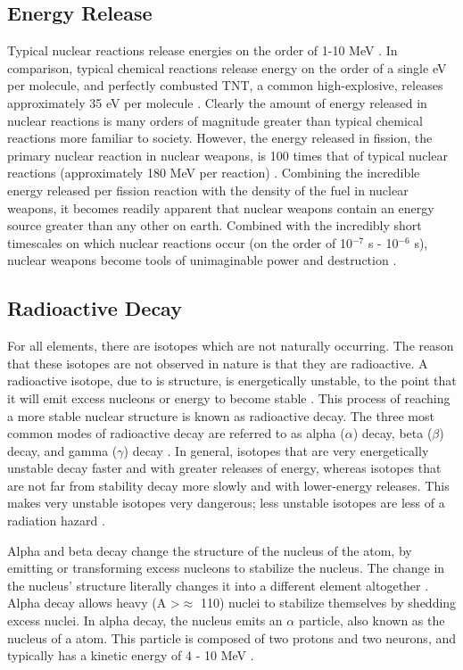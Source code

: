 \documentclass{report}
\begin{document}
\subsection{Energy Release}

Typical nuclear reactions release energies on the order of 1-10 MeV \cite{Prussin2014}. In comparison, typical chemical reactions release energy on the order of a single eV per molecule, and perfectly combusted TNT, a common high-explosive, releases approximately 35 eV per molecule \cite{Prussin2014}. Clearly the amount of energy released in nuclear reactions is many orders of magnitude greater than typical chemical reactions more familiar to society. However, the energy released in fission, the primary nuclear reaction in nuclear weapons, is 100 times that of typical nuclear reactions (approximately 180 MeV per reaction) \cite{krane1987introductory,Loveland2005}. Combining the incredible energy released per fission reaction with the density of the fuel in nuclear weapons, it becomes readily apparent that nuclear weapons contain an energy source greater than any other on earth. Combined  with the incredibly short timescales on which nuclear reactions occur (on the order of 10\(^{-7}\) s - 10\(^{-6}\) s),  nuclear weapons become tools of unimaginable power and destruction \cite{Loveland2005,Cochran1994}.  


\subsection{Radioactive Decay}

For all elements, there are isotopes which are not naturally occurring. The reason that these isotopes are not observed in nature is that they are radioactive. A radioactive isotope, due to is structure, is energetically unstable, to the point that it will emit excess nucleons or energy to become stable \cite{Loveland2005}. This process of reaching a more stable nuclear structure is known as radioactive decay. The three most common modes of radioactive decay are referred to as alpha (\(\alpha\)) decay, beta (\(\beta\)) decay, and gamma (\(\gamma\)) decay \cite{Loveland2005}. In general, isotopes that are very energetically unstable decay faster and with greater releases of energy, whereas isotopes that are not far from stability decay more slowly and with lower-energy releases. This makes very unstable isotopes very dangerous; less unstable isotopes are less of a radiation hazard \cite{krane1987introductory}.

Alpha and beta decay change the structure of the nucleus of the atom, by emitting or transforming excess nucleons to stabilize the nucleus. The change in the nucleus' structure literally changes it into a different element altogether \cite{krane1987introductory}. Alpha decay allows heavy (A \textgreater \(\approx\) 110) nuclei to stabilize themselves by shedding excess nuclei. In alpha decay, the nucleus emits an \(\alpha\) particle, also known as the nucleus of a  atom. This particle is composed of two protons and two neurons, and typically has a kinetic energy of 4 - 10 MeV \cite{krane1987introductory}. 
\end{document}
